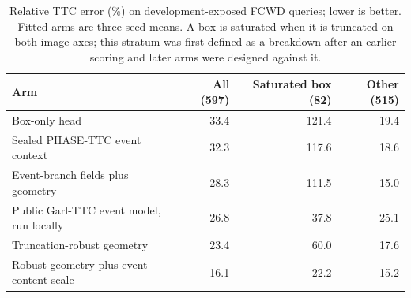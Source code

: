 \begin{table}[htbp]
\centering\small
\begin{tabular}{lrrr}
\toprule
Arm & All (597) & Saturated box (82) & Other (515) \\
\midrule
Box-only head & 33.4 & 121.4 & 19.4 \\
Sealed PHASE-TTC event context & 32.3 & 117.6 & 18.6 \\
Event-branch fields plus geometry & 28.3 & 111.5 & 15.0 \\
Public Garl-TTC event model, run locally & 26.8 & 37.8 & 25.1 \\
Truncation-robust geometry & 23.4 & 60.0 & 17.6 \\
Robust geometry plus event content scale & 16.1 & 22.2 & 15.2 \\
\bottomrule
\end{tabular}
\caption{Relative TTC error (\%) on development-exposed FCWD queries; lower is better. Fitted arms are three-seed means. A box is saturated when it is truncated on both image axes; this stratum was first defined as a breakdown after an earlier scoring and later arms were designed against it.}
\label{tab:followup-fcwd}
\end{table}
